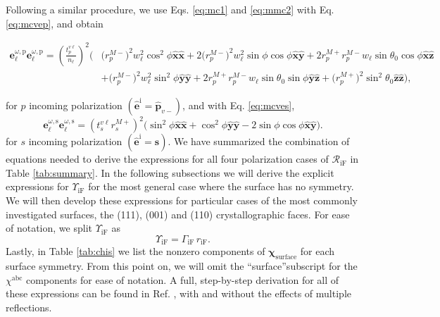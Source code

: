 \documentclass[aps,prb,10pt,showpacs,letterpaper,twocolumn]{revtex4-1}
\begin{document}
Following a similar procedure, we use Eqs. \eqref{eq:mc1} and \eqref{eq:mmc2}
with Eq. \eqref{eq:mcvep}, and obtain
\begin{widetext}
\begin{equation}\label{eq:ewewpmr}
\begin{split}
\mathbf{e}^{\omega,\mathrm{p}}_{\ell}\mathbf{e}^{\omega,\mathrm{p}}_{\ell} =
\left(\frac{t^{v\ell}_{p}}{n_{\ell}}\right)^{2}
\bigg(
 &\big(r^{M-}_{p}\big)^{2}w^{2}_{\ell}\cos^{2}\phi
  \hat{\mathbf{x}}\hat{\mathbf{x}}
+ 2\big(r^{M-}_{p}\big)^{2}w^{2}_{\ell}\sin\phi\cos\phi
  \hat{\mathbf{x}}\hat{\mathbf{y}}
+ 2r^{M+}_{p}r^{M-}_{p}w_{\ell}\sin\theta_{0}\cos\phi
  \hat{\mathbf{x}}\hat{\mathbf{z}}\\
&+ \big(r^{M-}_{p}\big)^{2}w^{2}_{\ell}\sin^{2}\phi
  \hat{\mathbf{y}}\hat{\mathbf{y}}
+ 2r^{M+}_{p}r^{M-}_{p}w_{\ell}\sin\theta_{0}\sin\phi
  \hat{\mathbf{y}}\hat{\mathbf{z}}
+ \big(r^{M+}_{p}\big)^{2}\sin^{2}\theta_{0}
   \hat{\mathbf{z}}\hat{\mathbf{z}}
\bigg),
\end{split}
\end{equation}
\end{widetext}
for $p$ incoming polarization $(\hat{\mathbf{e}}^{\mathrm{i}} =
\hat{\mathbf{p}}_{v-})$, and with Eq. \eqref{eq:mcves},
\begin{equation}\label{eq:ewewsmr}
\mathbf{e}^{\omega,\mathrm{s}}_{\ell}\mathbf{e}^{\omega,\mathrm{s}}_{\ell}
= \left(t^{v\ell}_{s}r^{M+}_{s}\right)^{2}
\big(
  \sin^{2}\phi\hat{\mathbf{x}}\hat{\mathbf{x}}
 + \cos^{2}\phi\hat{\mathbf{y}}\hat{\mathbf{y}}
 - 2\sin\phi\cos\phi\hat{\mathbf{x}}\hat{\mathbf{y}}
\big).
\end{equation}
for $s$ incoming polarization $(\hat{\mathbf{e}}^{\mathrm{i}} =
\hat{\mathbf{s}})$. We have summarized the combination of equations needed to
derive the expressions for all four polarization cases of
$\mathcal{R}_{\mathrm{iF}}$ in Table \ref{tab:summary}. In the following
subsections we will derive the explicit expressions for $\Upsilon_{\mathrm{iF}}$
for the most general case where the surface has no symmetry. We will then
develop these expressions for particular cases of the most commonly investigated
surfaces, the (111), (001) and (110) crystallographic faces. For ease of
notation, we split $\Upsilon_{\mathrm{iF}}$ as
\begin{equation}\label{eq:mc25}
\Upsilon_{\mathrm{iF}} = \Gamma_{\mathrm{iF}}\,r_{\mathrm{iF}}.
\end{equation} 
Lastly, in Table \ref{tab:chis} we list the nonzero components of
$\boldsymbol{\chi}_{\mathrm{surface}}$ for each surface symmetry.
\cite{sipePRB87, popovbook} From this point on, we will omit the
``surface''subscript for the $\chi^{\mathrm{abc}}$ components for ease of
notation. A full, step-by-step derivation for all of these expressions can be
found in Ref. , with and without the effects of
multiple reflections.
\end{document}
